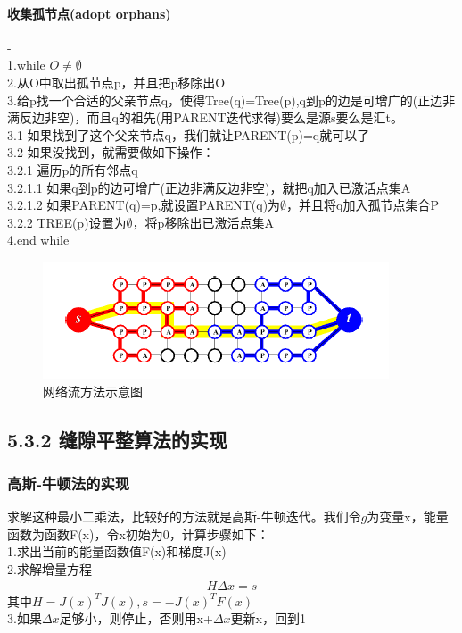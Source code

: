 \documentclass[11pt,a4,notitlepage]{article}
\begin{document}
\begin{CJK}{UTF8}{gkai}
\paragraph*{收集孤节点(adopt orphans)}-\\
1.while $O\ne \emptyset$ \\
2.从O中取出孤节点p，并且把p移除出O\\
3.给p找一个合适的父亲节点q，使得Tree(q)=Tree(p),q到p的边是可增广的(正边非满反边非空)，而且q的祖先(用PARENT迭代求得)要么是源s要么是汇t。\\
3.1 \qquad 如果找到了这个父亲节点q，我们就让PARENT(p)=q就可以了\\
3.2 \qquad 如果没找到，就需要做如下操作：\\
3.2.1 \qquad \qquad 遍历p的所有邻点q\\
3.2.1.1 \qquad \qquad \qquad 如果q到p的边可增广(正边非满反边非空)，就把q加入已激活点集A\\
3.2.1.2 \qquad \qquad \qquad 如果PARENT(q)=p,就设置PARENT(q)为$\emptyset$，并且将q加入孤节点集合P\\
3.2.2 \qquad \qquad TREE(p)设置为$\emptyset$，将p移除出已激活点集A\\
4.end while
 \begin{figure}[h]
	\centering
	\includegraphics{networkflow.png}
	\caption{网络流方法示意图}
\end{figure}
\subsection*{5.3.2 缝隙平整算法的实现}
\subsubsection*{高斯-牛顿法的实现}%
求解这种最小二乘法，比较好的方法就是高斯-牛顿迭代。我们令$g$为变量x，能量函数为函数F(x)，令x初始为0，计算步骤如下：\\
1.求出当前的能量函数值F(x)和梯度J(x)\\
2.求解增量方程
 \begin{align} H\Delta x=s	\end{align}
 其中$H=J(x)^{T}J(x),s=-J(x)^{T}F(x)$\\
3.如果$\Delta x$足够小，则停止，否则用x+$\Delta x$更新x，回到1

\end{CJK}
\end{document}

